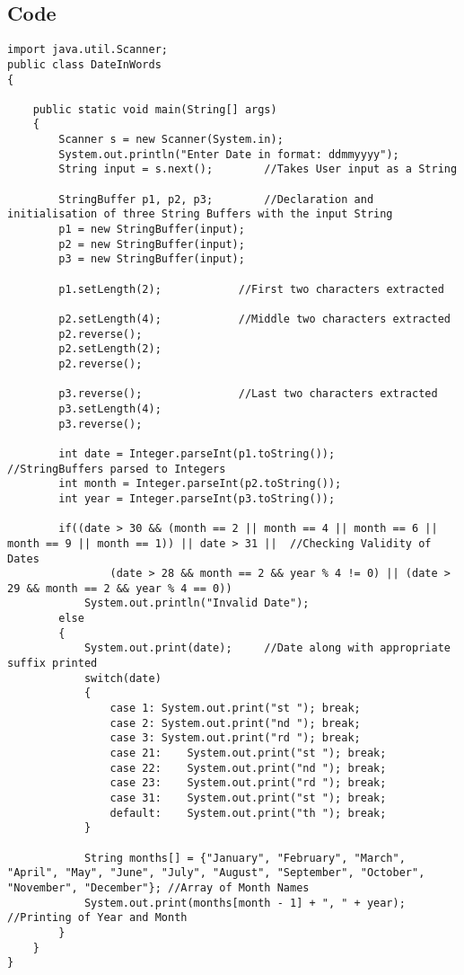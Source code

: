\documentclass[ProgrammingAssignment.tex]{subfiles}
\begin{document}
\subsection{Code}
\begin{lstlisting}
import java.util.Scanner;
public class DateInWords
{

	public static void main(String[] args)
	{
		Scanner s = new Scanner(System.in);
		System.out.println("Enter Date in format: ddmmyyyy");
		String input = s.next();		//Takes User input as a String
		
		StringBuffer p1, p2, p3;		//Declaration and initialisation of three String Buffers with the input String
		p1 = new StringBuffer(input);
		p2 = new StringBuffer(input);
		p3 = new StringBuffer(input);
		
		p1.setLength(2);			//First two characters extracted
		
		p2.setLength(4);			//Middle two characters extracted
		p2.reverse();
		p2.setLength(2);
		p2.reverse();
		
		p3.reverse();				//Last two characters extracted
		p3.setLength(4);
		p3.reverse();
		
		int date = Integer.parseInt(p1.toString());		//StringBuffers parsed to Integers
		int month = Integer.parseInt(p2.toString());
		int year = Integer.parseInt(p3.toString());
		
		if((date > 30 && (month == 2 || month == 4 || month == 6 || month == 9 || month == 1)) || date > 31 || 	//Checking Validity of Dates
				(date > 28 && month == 2 && year % 4 != 0) || (date > 29 && month == 2 && year % 4 == 0))
			System.out.println("Invalid Date");
		else
		{
			System.out.print(date);		//Date along with appropriate suffix printed
			switch(date)
			{
				case 1:	System.out.print("st "); break;
				case 2:	System.out.print("nd "); break;
				case 3:	System.out.print("rd "); break;
				case 21:	System.out.print("st "); break;
				case 22:	System.out.print("nd "); break;
				case 23:	System.out.print("rd "); break;
				case 31:	System.out.print("st "); break;
				default:	System.out.print("th "); break;
			}
			
			String months[] = {"January", "February", "March", "April", "May", "June", "July", "August", "September", "October", "November", "December"}; //Array of Month Names
			System.out.print(months[month - 1] + ", " + year); 		//Printing of Year and Month
		}
	}
}

\end{lstlisting}
\end{document}
